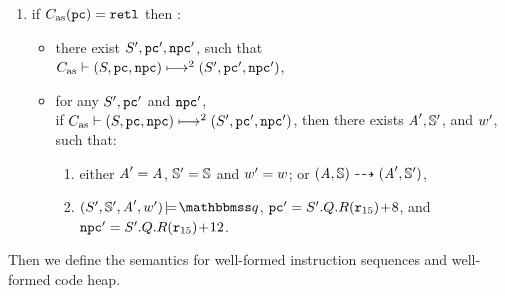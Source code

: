 \begin{definition}
\begin{enumerate}[1.]
        \item if $\asmimp(\pc) = \retl$ then :
            \begin{itemize}
                \item there exist $\state', \pc', \npc'$, such that
                \\
                $\multilptrans{\asmimp}{2}{(\state, \pc, \npc)}
                    {(\state', \pc', \npc')}$,
                
                \item for any $\state', \pc'$ and $\npc'$, \\ 
                if
                $\multilptrans{\asmimp}{2}{(\state, \pc, \npc)}{(\state', \pc', \npc')}$,
                then there exists $\primcom', \hpstate'$, and $\word'$, 
                such that: 
                \begin{enumerate}[(1)]
                    \item either $\primcom' = \primcom$, 
                    $\hpstate' = \hpstate$ and $\word' = \word$; 
                    or 
                    $\primTrans{(\primcom, \hpstate)}
                        {(\primcom', \hpstate')}$,
                    \item $\asrtmodel{(\state', \hpstate', \primcom', \word')}
                        {\relastQ}$, 
                        $\pc' = \state'.\Rstate.\RFile(\reg{15}) \!+\! 8$,
                        and
                        $\npc' = \state'.\Rstate.\RFile(\reg{15}) \!+\! 12$.
                \end{enumerate}
            \end{itemize}
    \end{enumerate}
\end{definition}

Then we define the semantics for well-formed instruction
sequences and well-formed code heap. 

